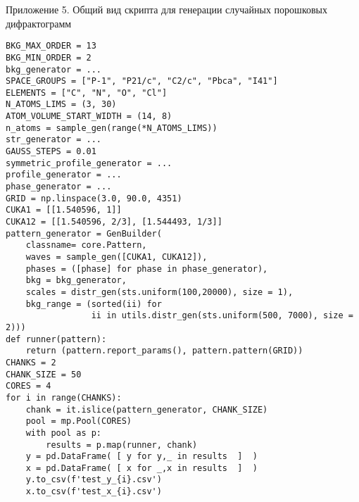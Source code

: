 \begin{center}
Приложение 5. Общий вид скрипта для генерации случайных порошковых дифрактограмм
\end{center}
\begin{verbatim}
BKG_MAX_ORDER = 13
BKG_MIN_ORDER = 2
bkg_generator = ...
SPACE_GROUPS = ["P-1", "P21/c", "C2/c", "Pbca", "I41"]
ELEMENTS = ["C", "N", "O", "Cl"]
N_ATOMS_LIMS = (3, 30)
ATOM_VOLUME_START_WIDTH = (14, 8)
n_atoms = sample_gen(range(*N_ATOMS_LIMS))
str_generator = ...
GAUSS_STEPS = 0.01
symmetric_profile_generator = ...
profile_generator = ...
phase_generator = ...
GRID = np.linspace(3.0, 90.0, 4351)
CUKA1 = [[1.540596, 1]]
CUKA12 = [[1.540596, 2/3], [1.544493, 1/3]]
pattern_generator = GenBuilder(
    classname= core.Pattern,
    waves = sample_gen([CUKA1, CUKA12]),
    phases = ([phase] for phase in phase_generator),
    bkg = bkg_generator,
    scales = distr_gen(sts.uniform(100,20000), size = 1),
    bkg_range = (sorted(ii) for
                 ii in utils.distr_gen(sts.uniform(500, 7000), size = 2)))
def runner(pattern):
    return (pattern.report_params(), pattern.pattern(GRID))
CHANKS = 2
CHANK_SIZE = 50
CORES = 4
for i in range(CHANKS):
    chank = it.islice(pattern_generator, CHANK_SIZE)
    pool = mp.Pool(CORES)
    with pool as p:
        results = p.map(runner, chank)
    y = pd.DataFrame( [ y for y,_ in results  ]  )
    x = pd.DataFrame( [ x for _,x in results  ]  )
    y.to_csv(f'test_y_{i}.csv')
    x.to_csv(f'test_x_{i}.csv')
\end{verbatim}
\newpage


